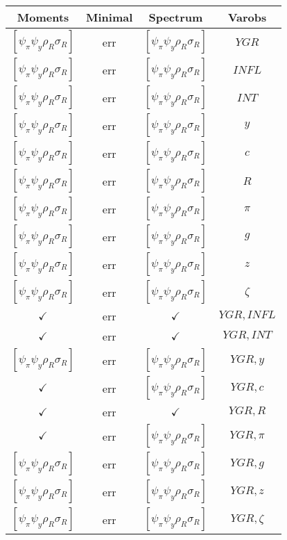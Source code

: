 \documentclass[a4paper,10pt]{article}
\begin{document}
\centering
\begin{longtable}{|c|c|c|c|}
\hline
Moments & Minimal & Spectrum & Varobs \\
\hline
$[\psi_\pi \psi_y \rho_R \sigma_R ]$ & err & $[\psi_\pi \psi_y \rho_R \sigma_R ]$ & ${YGR}$ \\
\hline
$[\psi_\pi \psi_y \rho_R \sigma_R ]$ & err & $[\psi_\pi \psi_y \rho_R \sigma_R ]$ & ${INFL}$ \\
\hline
$[\psi_\pi \psi_y \rho_R \sigma_R ]$ & err & $[\psi_\pi \psi_y \rho_R \sigma_R ]$ & ${INT}$ \\
\hline
$[\psi_\pi \psi_y \rho_R \sigma_R ]$ & err & $[\psi_\pi \psi_y \rho_R \sigma_R ]$ & ${y}$ \\
\hline
$[\psi_\pi \psi_y \rho_R \sigma_R ]$ & err & $[\psi_\pi \psi_y \rho_R \sigma_R ]$ & ${c}$ \\
\hline
$[\psi_\pi \psi_y \rho_R \sigma_R ]$ & err & $[\psi_\pi \psi_y \rho_R \sigma_R ]$ & ${R}$ \\
\hline
$[\psi_\pi \psi_y \rho_R \sigma_R ]$ & err & $[\psi_\pi \psi_y \rho_R \sigma_R ]$ & ${\pi}$ \\
\hline
$[\psi_\pi \psi_y \rho_R \sigma_R ]$ & err & $[\psi_\pi \psi_y \rho_R \sigma_R ]$ & ${g}$ \\
\hline
$[\psi_\pi \psi_y \rho_R \sigma_R ]$ & err & $[\psi_\pi \psi_y \rho_R \sigma_R ]$ & ${z}$ \\
\hline
$[\psi_\pi \psi_y \rho_R \sigma_R ]$ & err & $[\psi_\pi \psi_y \rho_R \sigma_R ]$ & ${\zeta}$ \\
\hline
$\checkmark$ & err & $\checkmark$ & ${YGR},{INFL}$ \\
\hline
$\checkmark$ & err & $\checkmark$ & ${YGR},{INT}$ \\
\hline
$[\psi_\pi \psi_y \rho_R \sigma_R ]$ & err & $[\psi_\pi \psi_y \rho_R \sigma_R ]$ & ${YGR},{y}$ \\
\hline
$\checkmark$ & err & $[\psi_\pi \psi_y \rho_R \sigma_R ]$ & ${YGR},{c}$ \\
\hline
$\checkmark$ & err & $\checkmark$ & ${YGR},{R}$ \\
\hline
$\checkmark$ & err & $[\psi_\pi \psi_y \rho_R \sigma_R ]$ & ${YGR},{\pi}$ \\
\hline
$[\psi_\pi \psi_y \rho_R \sigma_R ]$ & err & $[\psi_\pi \psi_y \rho_R \sigma_R ]$ & ${YGR},{g}$ \\
\hline
$[\psi_\pi \psi_y \rho_R \sigma_R ]$ & err & $[\psi_\pi \psi_y \rho_R \sigma_R ]$ & ${YGR},{z}$ \\
\hline
$[\psi_\pi \psi_y \rho_R \sigma_R ]$ & err & $[\psi_\pi \psi_y \rho_R \sigma_R ]$ & ${YGR},{\zeta}$ \\

\end{longtable}
\end{document}
